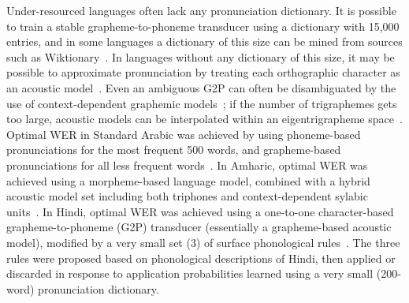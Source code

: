 Under-resourced languages often lack any pronunciation dictionary.  It
is possible to train a stable grapheme-to-phoneme transducer using a
dictionary with 15,000 entries, and in some languages a dictionary of
this size can be mined from sources such as
Wiktionary~\cite{Schlippe2014}.  In languages without any dictionary
of this size, it may be possible to approximate pronunciation by
treating each orthographic character as an acoustic 
model~\cite{Kanthak2002,Charoenpornsawat06,Gizaw2008,Le2009}.
Even an ambiguous G2P can often be disambiguated by the use of
context-dependent graphemic models~\cite{Kanthak2002}; if the number
of trigraphemes gets too large, acoustic models can be interpolated
within an eigentrigrapheme space~\cite{Ko2014}.  Optimal WER in
Standard Arabic was achieved by using phoneme-based pronunciations for
the most frequent 500 words, and grapheme-based pronunciations for all
less frequent words~\cite{Elmahdy2012}.  In Amharic, optimal WER was
achieved using a morpheme-based language model, combined with a hybrid
acoustic model set including both triphones and context-dependent
sylabic units~\cite{Tachbelie2014}.  In Hindi, optimal WER was
achieved using a one-to-one character-based grapheme-to-phoneme (G2P)
transducer (essentially a grapheme-based acoustic model), modified by
a very small set (3) of surface phonological
rules~\cite{Jyothi2015interspeech_hindi}.  The three rules were
proposed based on phonological descriptions of Hindi, then applied or
discarded in response to application probabilities learned using a
very small (200-word) pronunciation dictionary.

